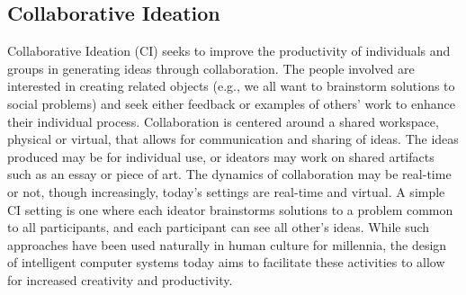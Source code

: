 \documentclass[final,authoryear,5p,times,twocolumn]{elsarticle}
\begin{document}
\subsection{Collaborative Ideation}

Collaborative Ideation (CI) seeks to improve the productivity of individuals and groups in generating ideas through collaboration. The people involved are interested in creating related objects (e.g., we all want to brainstorm solutions to social problems) and seek either feedback or examples of others' work to enhance their individual process. Collaboration is centered around a shared workspace, physical or virtual, that allows for communication and sharing of ideas. The ideas produced may be for individual use, or ideators may work on shared artifacts such as an essay or piece of art. The dynamics of collaboration may be real-time or not, though increasingly, today's settings are real-time and virtual. A simple CI setting is one where each ideator brainstorms solutions to a problem common to all participants, and each participant can see all other's ideas. While such approaches have been used naturally in human culture for millennia, the design of intelligent computer systems today aims to facilitate these activities to allow for increased creativity and productivity. 
\end{document}
